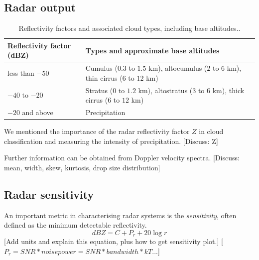 \documentclass{article}
\begin{document}
\subsection{Radar output}
\begin{table}
	\centering
	\begin{tabular}{l|l}
		Reflectivity factor (dBZ) & Types and approximate base altitudes                                                               \\
		\midrule
		less than \(-50\)         & Cumulus (\(0.3\) to \(1.5\) \si{\kilo\metre}), altocumulus (\(2\) to \(6\) \si{\kilo\metre}), thin cirrus (\(6\) to \(12\) \si{\kilo\metre}) \\
		\(-40\) to \(-20\)        & Stratus (\(0\) to \(1.2\) \si{\kilo\metre}), altostratus (\(3\) to \(6\) \si{\kilo\metre}), thick cirrus (\(6\) to \(12\) \si{\kilo\metre})  \\
		\(-20\) and above         & Precipitation                                                                                     
	\end{tabular}
	\caption{Reflectivity factors and associated cloud types,\supercite{GorkaReflectivity} including base altitudes.\supercite{CloudTypes}.}
	\label{tbl:dBZInterpretation}
\end{table}

We mentioned the importance of the radar reflectivity factor \(Z\) in cloud classification and measuring the intensity of precipitation.
[Discuss: Z]

Further information can be obtained from Doppler velocity spectra.
[Discuss: mean, width, skew, kurtosis, drop size distribution]

\supercite{RadarMeteorology}

\subsection{Radar sensitivity}
An important metric in characterising radar systems is the \textit{sensitivity}, often defined as the minimum detectable reflectivity. 
\begin{equation}
	dBZ = C + P_r + 20\log{r}
\end{equation}
[Add units and explain this equation, plus how to get sensitivity plot.]
[\(P_r = SNR * noise power = SNR * bandwidth * kT\)...]
\end{document}
